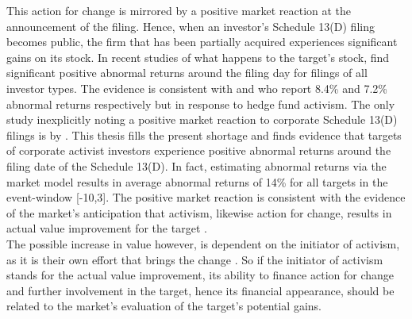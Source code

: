 \documentclass[12pt]{article}
\begin{document}
This action for change is mirrored by a positive market reaction at the announcement of the filing. Hence, when an investor's Schedule 13(D) filing becomes public, the firm that has been partially acquired experiences significant gains on its stock. In recent studies of what happens to the target's stock, \citet[p.1564]{Collin-Dufresne2015} find significant positive abnormal returns around the filing day for filings of all investor types. The evidence is consistent with \citet[p.1756]{Brav2008} and \citet[p.209]{Klein2009} who report 8.4\% and 7.2\% abnormal returns respectively but in response to hedge fund activism. The only study inexplicitly noting a positive market reaction to corporate Schedule 13(D) filings is by \citet[p.29]{Brigida2012}. This thesis fills the present shortage and finds evidence that targets of corporate activist investors experience positive abnormal returns around the filing date of the Schedule 13(D). In fact, estimating abnormal returns via the market model results in average abnormal returns of 14\% for all targets in the event-window [-10,3]. The positive market reaction is consistent with the evidence of the market's anticipation that activism, likewise action for change, results in actual value improvement for the target \citep[p.1760]{Brav2008}.\\
The possible increase in value however, is dependent on the initiator of activism, as it is their own effort that brings the change \citep[p.1563]{Collin-Dufresne2015}. So if the initiator of activism stands for the actual value improvement, its ability to finance action for change and further involvement in the target, hence its financial appearance, should be related to the market's evaluation of the target's potential gains.
\end{document}
